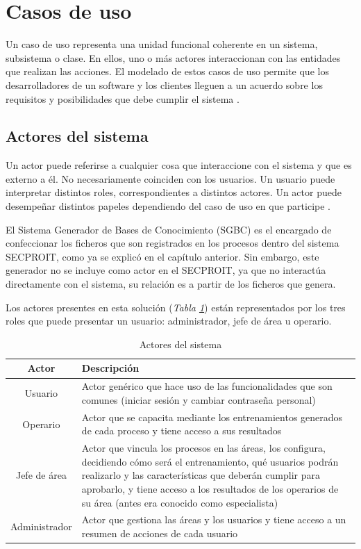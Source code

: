 
\section{Casos de uso}
Un caso de uso representa una unidad funcional coherente en un sistema, subsistema o clase. En ellos, uno o más actores interaccionan con las entidades que realizan las acciones. El modelado de estos casos de uso permite que los desarrolladores de un software y los clientes lleguen a un acuerdo sobre los requisitos y posibilidades que debe cumplir el sistema \cite{Kalaivani2004}.

\subsection{Actores del sistema} 
Un actor puede referirse a cualquier cosa que interaccione con el sistema y que es externo a él. No necesariamente coinciden con los usuarios. Un usuario puede interpretar distintos roles, correspondientes a distintos actores. Un actor puede desempeñar distintos papeles dependiendo del caso de uso en que participe \cite{Kalaivani2004}.

El Sistema Generador de Bases de Conocimiento (SGBC) es el encargado de confeccionar los ficheros que son registrados en los procesos dentro del sistema SECPROIT, como ya se explicó en el capítulo anterior. Sin embargo, este generador no se incluye como actor en el SECPROIT, ya que no interactúa directamente con el sistema, su relación es a partir de los ficheros que genera.

Los actores presentes en esta solución (\textsl{Tabla \ref{tab:actores}}) están representados por los tres roles que puede presentar un usuario: administrador, jefe de área u operario.

\begin{table}[H]
\begin{center}
\begin{tabular}{ | c | p{11cm} | }
\hline
\textbf{Actor} & \textbf{Descripción} \\
\hline
Usuario & Actor genérico que hace uso de las funcionalidades que son comunes (iniciar sesión y cambiar contraseña personal) \\
\hline
Operario & Actor que se capacita mediante los entrenamientos generados de cada proceso y tiene acceso a sus resultados \\
\hline
Jefe de área & Actor que vincula los procesos en las áreas, los configura, decidiendo cómo será el entrenamiento, qué usuarios podrán realizarlo y las características que deberán cumplir para aprobarlo, y tiene acceso a los resultados de los operarios de su área (antes era conocido como especialista) \\
\hline
Administrador & Actor que gestiona las áreas y los usuarios y tiene acceso a un resumen de acciones de cada usuario \\
\hline
\end{tabular}
\caption{Actores del sistema}
\label{tab:actores}
\end{center}
\end{table}

